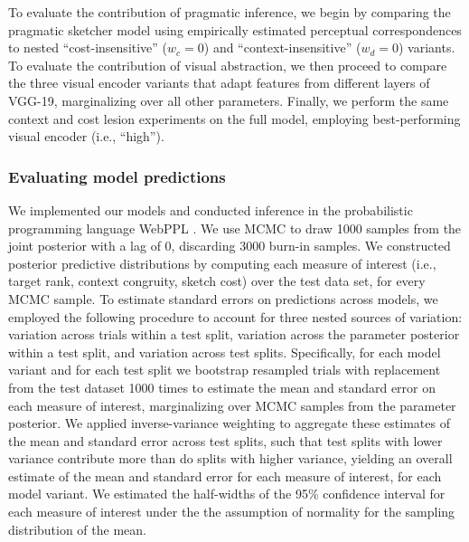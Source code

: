 \documentclass[9pt,twocolumn,twoside]{pnas-new}
\begin{document}
{To evaluate the contribution of pragmatic inference, we begin by comparing the pragmatic sketcher model using empirically estimated perceptual correspondences to nested ``cost-insensitive'' ($w_c = 0$) and ``context-insensitive'' ($w_d = 0$) variants. To evaluate the contribution of visual abstraction, we then proceed to compare the three visual encoder variants that adapt features from different layers of VGG-19, marginalizing over all other parameters. Finally, we perform the same context and cost lesion experiments on the full model, employing best-performing visual encoder (i.e., ``high'').

\subsubsection*{Evaluating model predictions}


We implemented our models and conducted inference in the probabilistic programming language WebPPL \cite{goodman2014design}.
We use MCMC to draw 1000 samples from the joint posterior with a lag of 0, discarding 3000 burn-in samples.
We constructed posterior predictive distributions by computing each measure of interest (i.e., target rank, context congruity, sketch cost) over the test data set, for every MCMC sample.
To estimate standard errors on predictions across models, we employed the following procedure to account for three nested sources of variation: variation across trials within a test split, variation across the parameter posterior within a test split, and variation across test splits.  
Specifically, for each model variant and for each test split we bootstrap resampled trials with replacement from the test dataset 1000 times to estimate the mean and standard error on each measure of interest, marginalizing over MCMC samples from the parameter posterior. 
We applied inverse-variance weighting to aggregate these estimates of the mean and standard error across test splits, such that test splits with lower variance contribute more than do splits with higher variance, yielding an overall estimate of the mean and standard error for each measure of interest, for each model variant. 
We estimated the half-widths of the 95\% confidence interval for each measure of interest under the the assumption of normality for the sampling distribution of the mean.

}
\end{document}
